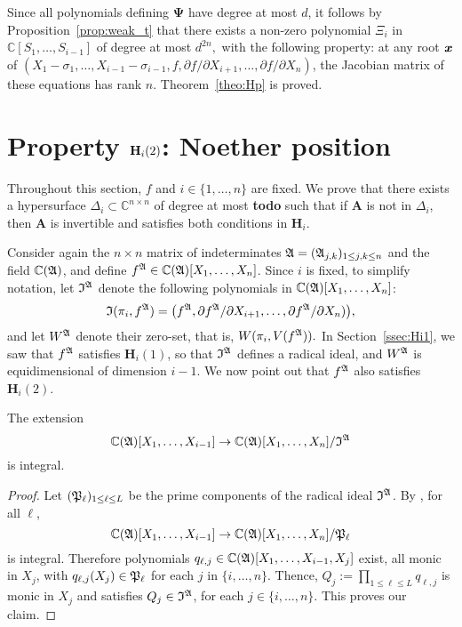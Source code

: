 \documentclass[sigconf]{acmart}
\def\td{{\bf todo}}
\def\mA{{\bm A}}
\def\xb{\textit{\textbf{x}}}
\def\C{\mathbb{C}}
\def\pa{\partial}
\def\D{\Delta}
\def\I{\frak{I}}
\def\A{\frak{A}}
\def\fp{\frak{P}}
\begin{document}
Since all polynomials defining $\bm\Psi$ have degree at most $d$, it
follows by Proposition~\ref{prop:weak_t} that there exists a non-zero
polynomial $\Xi_i$ in $\C[S_1,\dots,S_{i-1}]$ of degree at most
$d^{2n},$ with the following property: at any root $\xb$ of
$(X_1-\sigma_1,\dots,X_{i-1}-\sigma_{i-1},f, {\pa f}/{\pa
  X_{i+1}},\dots,{\pa f}/{\pa X_n})$, the Jacobian matrix of these
equations has rank $n$. Theorem~\ref{theo:Hp} is proved.


\section{Property ${\bf H}_i(2)$: Noether position}\label{sec:Hi2}

Throughout this section, $f$ and $i \in \{1,\hdots,n\}$ are fixed. We
prove that there exists a hypersurface $\D_{i} \subset \C^{n\times
  n}$ of degree at most \td{} such that if $\mA$ is not in $\D_{i}$,
then $\mA$ is invertible and satisfies both conditions in
$\textbf{H}_i$.

Consider again the $n\times n$ matrix of indeterminates
$\A=(\A_{j,k})_{1 \le j,k \le n}$ and the field $\C(\A)$,
and define $f^{\A} \in \C(\A)[X_1,\dots,X_n]$.  Since $i$ is fixed, to
simplify notation, let $\I^\A$ denote the following polynomials in
$\C(\A)[X_1,\dots,X_n]$:
$$\I(\pi_i,f^\A)= \big (f^\A, {\pa f^\A}/{\pa X_{i+1}},\dots,{\pa
  f^\A}/{\pa X_n}) \big ),$$ and let $W^\A$ denote their zero-set,
that is, $W(\pi_i,V(f^\A)).$ In Section~\ref{ssec:Hi1}, we saw that
$f^\A$ satisfies $\textbf{H}_i(1)$, so that $\I^\A$ defines a
radical ideal, and $W^\A$ is equidimensional of dimension $i-1$. We
now point out that $f^\A$ also satisfies $\textbf{H}_i(2)$.


\begin{lemma} 
 The extension $$\C(\A)[X_1,\dots,X_{i-1}]\rightarrow
 \C(\A)[X_1,\dots,X_n]/\I^{\A}$$ is integral.
\end{lemma}
\begin{proof}
  Let $(\fp_\ell)_{1 \le \ell \leq L}$ be the prime components of
  the radical ideal $\I^\A$. By \cite[Proposition 1]{EMP}, for all
  $\ell$,
  \[
    \C(\A)[X_1,\dots,X_{i-1}]\rightarrow\C(\A)[X_1,\dots,X_n]/\fp_\ell
  \] 
  is integral. Therefore polynomials
  $q_{\ell,j}\in\C(\A)[X_1,\dots,X_{i-1},X_j]$ exist, all monic in
  $X_j$, with $q_{\ell,j}(X_j)\in \fp_\ell$ for each $j$ in
  $\{i,\hdots,n\}.$ Thence, $ Q_{j} := \prod_{1 \le \ell\le L}
  q_{\ell,j}$ is monic in $X_j$ and satisfies $ Q_{j} \in \I^\A$, for
  each $j \in \{i,\hdots,n\}.$ This proves our claim.
\end{proof}
\end{document}
